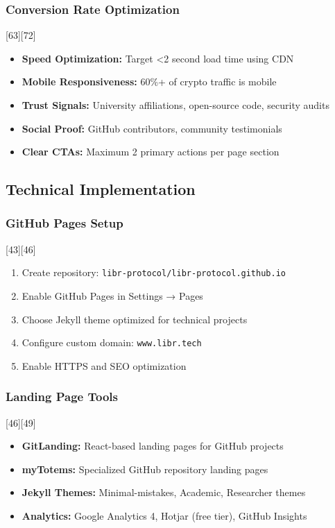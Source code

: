 \documentclass[12pt,a4paper]{article}
\begin{document}
\subsubsection{Conversion Rate Optimization}[63][72]
\begin{itemize}
    \item \textbf{Speed Optimization:} Target <2 second load time using CDN
    \item \textbf{Mobile Responsiveness:} 60\%+ of crypto traffic is mobile
    \item \textbf{Trust Signals:} University affiliations, open-source code, security audits
    \item \textbf{Social Proof:} GitHub contributors, community testimonials
    \item \textbf{Clear CTAs:} Maximum 2 primary actions per page section
\end{itemize}

\subsection{Technical Implementation}

\subsubsection{GitHub Pages Setup}[43][46]
\begin{enumerate}
    \item Create repository: \texttt{libr-protocol/libr-protocol.github.io}
    \item Enable GitHub Pages in Settings → Pages
    \item Choose Jekyll theme optimized for technical projects
    \item Configure custom domain: \texttt{www.libr.tech}
    \item Enable HTTPS and SEO optimization
\end{enumerate}

\subsubsection{Landing Page Tools}[46][49]
\begin{itemize}
    \item \textbf{GitLanding:} React-based landing pages for GitHub projects
    \item \textbf{myTotems:} Specialized GitHub repository landing pages
    \item \textbf{Jekyll Themes:} Minimal-mistakes, Academic, Researcher themes
    \item \textbf{Analytics:} Google Analytics 4, Hotjar (free tier), GitHub Insights
\end{itemize}
\end{document}
